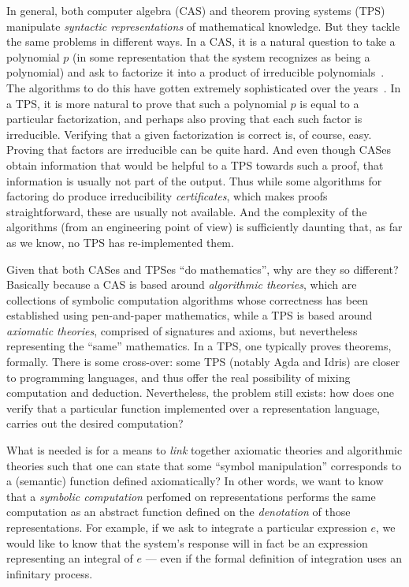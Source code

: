 \documentclass[fleqn]{llncs}
\begin{document}
In general, both computer algebra (CAS) and theorem proving systems (TPS)
manipulate \emph{syntactic representations} of mathematical knowledge.  But
they tackle the same problems in different ways. In a CAS, it is a natural
question to take a polynomial $p$ (in some representation that the system
recognizes as being a polynomial) and ask to factorize it into a product of
irreducible polynomials~\cite{von2003modern}.  The algorithms to do this
have gotten extremely sophisticated over the years~\cite{vanhoeij2002}.
In a TPS, it is more natural to prove that such a polynomial $p$ is
equal to a particular factorization, and perhaps also proving that each
such factor is irreducible. Verifying that a given factorization is 
correct is, of course, easy. Proving that factors are irreducible can be
quite hard. And even though CASes obtain information that would be helpful
to a TPS towards such a proof, that information is usually not part of
the output. Thus while some algorithms for factoring do produce irreducibility
\emph{certificates}, which makes proofs straightforward, these are usually
not available. And the complexity of the algorithms (from an engineering
point of view) is sufficiently daunting that, as far as we know, no TPS
has re-implemented them.

Given that both CASes and TPSes ``do mathematics'', why are they so 
different? Basically because a CAS is based around
\emph{algorithmic theories}, which are collections of symbolic computation
algorithms whose correctness has been established using pen-and-paper
mathematics, while a TPS is based around \emph{axiomatic theories},
comprised of signatures and axioms, but nevertheless representing the
``same'' mathematics. In a TPS, one typically proves theorems, formally.
There is some cross-over: some TPS (notably Agda and Idris) are closer
to programming languages, and thus offer the real possibility of mixing
computation and deduction. Nevertheless, the problem still exists: how
does one verify that a particular function implemented over a representation
language, carries out the desired computation?

What is needed is for a means to \emph{link} together axiomatic theories
and algorithmic theories such that one can state that some ``symbol
manipulation'' corresponds to a (semantic) function defined axiomatically?
In other words, we want to know that a \emph{symbolic computation}
perfomed on representations performs the same computation as an abstract
function defined on the \emph{denotation} of those representations.
For example, if we ask to integrate a particular expression $e$, we would like
to know that the system's response will in fact be an expression representing
an integral of $e$ --- even if the formal definition of integration uses an
infinitary process.
\end{document}
